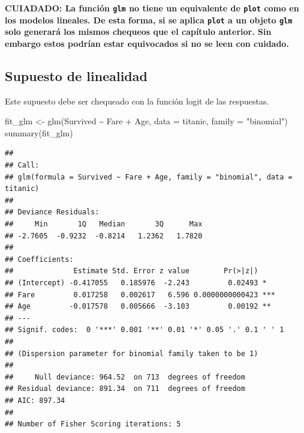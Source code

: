 \documentclass[
  12pt,
]{book}
\newenvironment{Shaded}{\begin{snugshade}}{\end{snugshade}}
\newcommand{\AttributeTok}[1]{\textcolor[rgb]{0.77,0.63,0.00}{#1}}
\newcommand{\FunctionTok}[1]{\textcolor[rgb]{0.00,0.00,0.00}{#1}}
\newcommand{\NormalTok}[1]{#1}
\newcommand{\OtherTok}[1]{\textcolor[rgb]{0.56,0.35,0.01}{#1}}
\newcommand{\SpecialCharTok}[1]{\textcolor[rgb]{0.00,0.00,0.00}{#1}}
\newcommand{\StringTok}[1]{\textcolor[rgb]{0.31,0.60,0.02}{#1}}
\theoremstyle{definition}
\theoremstyle{definition}
\theoremstyle{definition}
\theoremstyle{remark}
\begin{document}
\textbf{CUIADADO: La función \texttt{glm} no tiene un equivalente de \texttt{plot} como en los modelos lineales. De esta forma, si se aplica \texttt{plot} a un objeto \texttt{glm} solo generará los mismos chequeos que el capítulo anterior. Sin embargo estos podrían estar equivocados si no se leen con cuidado.}

\hypertarget{supuesto-de-linealidad}{%
\subsection{Supuesto de linealidad}\label{supuesto-de-linealidad}}

Este supuesto debe ser chequeado con la función logit de las respuestas.

\begin{Shaded}
\begin{Highlighting}[]
\NormalTok{fit\_glm }\OtherTok{\textless{}{-}} \FunctionTok{glm}\NormalTok{(Survived }\SpecialCharTok{\textasciitilde{}}\NormalTok{ Fare }\SpecialCharTok{+}\NormalTok{ Age, }\AttributeTok{data =}\NormalTok{ titanic, }
    \AttributeTok{family =} \StringTok{"binomial"}\NormalTok{)}
\FunctionTok{summary}\NormalTok{(fit\_glm)}
\end{Highlighting}
\end{Shaded}

\begin{verbatim}
## 
## Call:
## glm(formula = Survived ~ Fare + Age, family = "binomial", data = titanic)
## 
## Deviance Residuals: 
##     Min       1Q   Median       3Q      Max  
## -2.7605  -0.9232  -0.8214   1.2362   1.7820  
## 
## Coefficients:
##              Estimate Std. Error z value        Pr(>|z|)    
## (Intercept) -0.417055   0.185976  -2.243         0.02493 *  
## Fare         0.017258   0.002617   6.596 0.0000000000423 ***
## Age         -0.017578   0.005666  -3.103         0.00192 ** 
## ---
## Signif. codes:  0 '***' 0.001 '**' 0.01 '*' 0.05 '.' 0.1 ' ' 1
## 
## (Dispersion parameter for binomial family taken to be 1)
## 
##     Null deviance: 964.52  on 713  degrees of freedom
## Residual deviance: 891.34  on 711  degrees of freedom
## AIC: 897.34
## 
## Number of Fisher Scoring iterations: 5
\end{verbatim}
\end{document}
